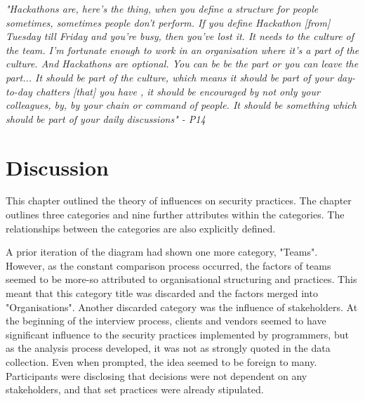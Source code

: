 \newline
\par
\textit{"Hackathons are, here's the thing, when you define a structure for people sometimes, sometimes people don't perform. If you define Hackathon [from] Tuesday till Friday and you're busy, then you've lost it. It needs to the culture of the team. I'm fortunate enough to work in an organisation where it's a part of the culture. And Hackathons are optional. You can be be the part or you can leave the part... It should be part of the culture, which means it should be part of your day-to-day chatters [that] you have , it should be encouraged by not only your colleagues, by, by your chain or command of people. It should be something which should be part of your daily discussions" - P14 }

\section{Discussion}

This chapter outlined the theory of influences on security practices. The chapter outlines three categories and nine further attributes within the categories. The relationships between the categories are also explicitly defined. 
\newline
\par
A prior iteration of the diagram had shown one more category, "Teams". However, as the constant comparison process occurred, the factors of teams seemed to be more-so attributed to organisational structuring and practices. This meant that this category title was discarded and the factors merged into "Organisations". Another discarded category was the influence of stakeholders. At the beginning of the interview process, clients and vendors seemed to have significant influence to the security practices implemented by programmers, but as the analysis process developed, it was not as strongly quoted in the data collection. Even when prompted, the idea seemed to be foreign to many. Participants were disclosing that decisions were not dependent on any stakeholders, and that set practices were already stipulated.